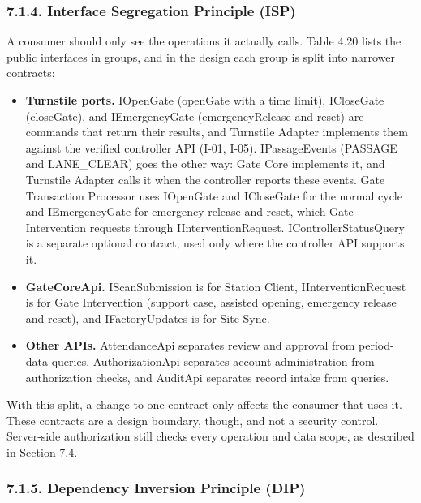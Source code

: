 \subsubsection*{7.1.4. Interface Segregation Principle (ISP)}

{}

A consumer should only see the operations it actually calls. Table 4.20 lists the public interfaces in groups, and in the design each group is split into narrower contracts:

\begin{itemize}[leftmargin=36pt, itemsep=2pt, topsep=4pt, parsep=2pt]
  \item \textbf{Turnstile ports.} IOpenGate (openGate with a time limit), ICloseGate (closeGate), and IEmergencyGate (emergencyRelease and reset) are commands that return their results, and Turnstile Adapter implements them against the verified controller API (I-01, I-05). IPassageEvents (PASSAGE and LANE\_CLEAR) goes the other way: Gate Core implements it, and Turnstile Adapter calls it when the controller reports these events. Gate Transaction Processor uses IOpenGate and ICloseGate for the normal cycle and IEmergencyGate for emergency release and reset, which Gate Intervention requests through IInterventionRequest. IControllerStatusQuery is a separate optional contract, used only where the controller API supports it.
  \item \textbf{GateCoreApi.} IScanSubmission is for Station Client, IInterventionRequest is for Gate Intervention (support case, assisted opening, emergency release and reset), and IFactoryUpdates is for Site Sync.
  \item \textbf{Other APIs.} AttendanceApi separates review and approval from period-data queries, AuthorizationApi separates account administration from authorization checks, and AuditApi separates record intake from queries.
\end{itemize}

With this split, a change to one contract only affects the consumer that uses it. These contracts are a design boundary, though, and not a security control. Server-side authorization still checks every operation and data scope, as described in Section 7.4.

\subsubsection*{7.1.5. Dependency Inversion Principle (DIP)}

